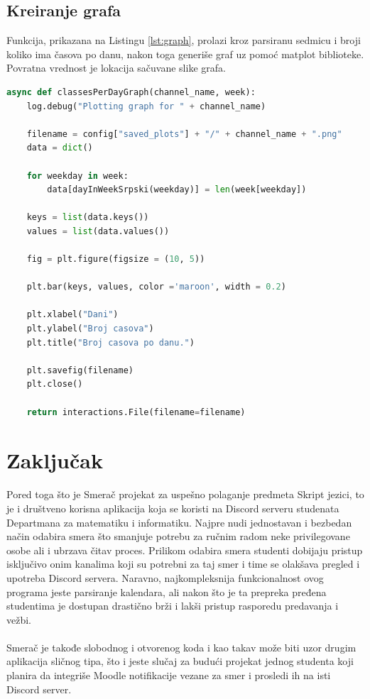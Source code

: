 \documentclass[a4paper,11pt]{article}
\begin{document}
\subsection{Kreiranje grafa}
Funkcija, prikazana na Listingu \ref{lst:graph}, prolazi kroz parsiranu sedmicu i broji koliko ima časova po danu, nakon toga generiše graf uz pomoć matplot\cite{matplotlib} biblioteke. Povratna vrednost je lokacija sačuvane slike grafa.
\begin{lstlisting}[language=Python, caption=Kreiranje grafa, label=lst:graph]
async def classesPerDayGraph(channel_name, week):
    log.debug("Plotting graph for " + channel_name)

    filename = config["saved_plots"] + "/" + channel_name + ".png"
    data = dict()

    for weekday in week:
        data[dayInWeekSrpski(weekday)] = len(week[weekday])

    keys = list(data.keys())
    values = list(data.values())

    fig = plt.figure(figsize = (10, 5))

    plt.bar(keys, values, color ='maroon', width = 0.2)

    plt.xlabel("Dani")
    plt.ylabel("Broj casova")
    plt.title("Broj casova po danu.")

    plt.savefig(filename)
    plt.close()

    return interactions.File(filename=filename)
\end{lstlisting}
\newpage
\section{Zaključak}
Pored toga što je Smerač projekat za uspešno polaganje predmeta Skript jezici, to je i društveno korisna aplikacija koja se koristi na Discord serveru studenata Departmana za matematiku i informatiku. Najpre nudi jednostavan i bezbedan način odabira smera što smanjuje potrebu za ručnim radom neke privilegovane osobe ali i ubrzava čitav proces. Prilikom odabira smera studenti dobijaju pristup isključivo onim kanalima koji su potrebni za taj smer i time se olakšava pregled i upotreba Discord servera. Naravno, najkompleksnija funkcionalnost ovog programa jeste parsiranje kalendara, ali nakon što je ta prepreka pređena studentima je dostupan drastično brži i lakši pristup rasporedu predavanja i vežbi.
\\\\
Smerač je takođe slobodnog i otvorenog koda i kao takav može biti uzor drugim aplikacija sličnog tipa, što i jeste slučaj za budući projekat jednog studenta koji planira da integriše Moodle notifikacije vezane za smer i prosledi ih na isti Discord server.
\newpage

\pagestyle{plain}
\renewcommand\refname{Literatura}


\end{document}
